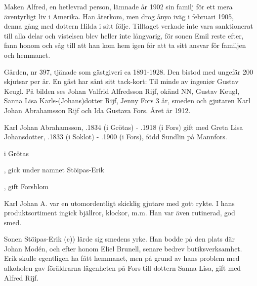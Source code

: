 Maken Alfred, en hetlevrad person, lämnade år 1902 sin familj för ett mera äventyrligt liv i Amerika. Han återkom, men drog ånyo iväg i februari 1905, denna gång med dottern Hilda i sitt följe. Tilltaget verkade inte vara sanktionerat till alla delar och vistelsen blev heller inte långvarig, för sonen Emil reste efter, fann honom och såg till att han kom hem igen för att ta sitt ansvar för familjen och hemmanet.




Gården, nr 397, tjänade som gästgiveri ca 1891-1928. Den bistod med ungefär 200 skjutsar per år. En gäst har sänt sitt tack-kort: Til minde av ingeniør Gustav Keugl. På bilden ses Johan Valfrid Alfredsson Rijf, okänd NN, Gustav Keugl, Sanna Lisa Karls-(Johans)dotter Rijf, Jenny Fors 3 år, smeden och gjutaren Karl Johan Abrahamsson Rijf och Ida Gustava Fors. Året är 1912.




Karl Johan Abrahamsson, .1834 (i Grötas) - .1918 (i Fors) gift med Greta Lisa Johansdotter, .1833 (i Soklot) - .1900 (i Fors), född Sundlin på Mannfors.
\begin{jhchildren}
  \item {} i Grötas
  \item {}
  \item {}, gick under namnet Stöipas-Erik
  \item {}
  \item {}, gift Forsblom
\end{jhchildren}


Karl Johan A. var en utomordentligt skicklig gjutare med gott rykte. I hans produktsortiment ingick bjällror, klockor, m.m. Han var även rutinerad, god smed.

Sonen Stöipas-Erik (c)) lärde sig smedens yrke. Han bodde på den plats där Johan Modén, och efter honom Eliel Brunell, senare bedrev butiksverksamhet. Erik skulle egentligen ha fått hemmanet, men på grund av hans problem med alkoholen gav föräldrarna lägenheten på Fors till dottern Sanna Lisa, gift med Alfred Rijf.

